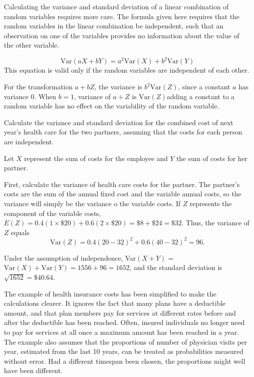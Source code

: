 Calculating the variance and standard deviation of a linear combination of random variables requires more care.  The formula given here requires that the random variables in the linear combination be independent, such that an observation on one of the variables provides no information about the value of the other variable. 

\begin{termBox}{
\[\text{Var}(aX + bY) = a^2 \text{Var}(X) + b^2\text{Var}(Y)\]
		This equation is valid only if the random variables are independent of each other.}
\end{termBox}

For the transformation $a + bZ$, the variance is $b^{2} \text{Var}(Z)$, since a constant $a$ has variance 0.  When $b = 1$, variance of $a + Z$ is $\text{Var}(Z)$\textemdash adding a constant to a random variable has no effect on the variability of the random variable.

\newpage

\begin{example}{Calculate the variance and standard deviation for the combined cost of next year's health care for the two partners, assuming that the costs for each person are independent.}

Let $X$ represent the sum of costs for the employee and $Y$ the sum of costs for her partner.
	
First, calculate the variance of health care costs for the partner. The partner's costs are the sum of the annual fixed cost and the variable annual costs, so the variance will simply be the variance o the variable costs. If $Z$ represents the component of the variable costs, $E(Z) = 0.4(1 \times \$20) + 0.6(2 \times \$20) = \$8 + \$24 = \$32$. Thus, the variance of $Z$ equals
\[\textrm{Var}(Z) = 0.4(20 - 32)^2 + 0.6(40 - 32)^2 = 96. \]

Under the assumption of independence, Var$(X + Y)$ = $\text{Var}(X) + \text{Var}(Y) = 1556 + 96 = 1652$, and the standard deviation is $\sqrt{1652} = \$40.64$.

\end{example}

The example of health insurance costs has been simplified to make the calculations clearer.  It ignores the fact that many plans have a deductible amount, and that plan members pay for services at different rates before and after the deductible has been reached. Often, insured individuals no longer need to pay for services at all once a maximum amount has been reached in a year. The example also assumes that the proportions of number of physician visits per year, estimated from the last 10 years, can be treated as probabilities measured without error. Had a different timespan been chosen, the proportions might well have been different.  

